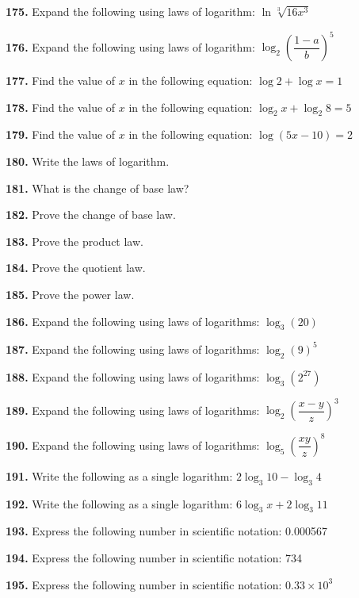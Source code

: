 \documentclass[11pt]{article}
\begin{document}
\bigskip
\noindent\textbf{175.} Expand the following using laws of logarithm: $\ln \sqrt[3]{16x^3}$

\bigskip
\noindent\textbf{176.} Expand the following using laws of logarithm: $\log_2\left(\dfrac{1-a}{b}\right)^5$

\bigskip
\noindent\textbf{177.} Find the value of $x$ in the following equation: $\log 2 + \log x =1$

\bigskip
\noindent\textbf{178.} Find the value of $x$ in the following equation: $\log_2 x+\log_2 8=5$

\bigskip
\noindent\textbf{179.} Find the value of $x$ in the following equation: $\log(5x-10)=2$

\bigskip
\noindent\textbf{180.} Write the laws of logarithm.

\bigskip
\noindent\textbf{181.} What is the change of base law?

\bigskip
\noindent\textbf{182.} Prove the change of base law.

\bigskip
\noindent\textbf{183.} Prove the product law.

\bigskip
\noindent\textbf{184.} Prove the quotient law.

\bigskip
\noindent\textbf{185.} Prove the power law.

\bigskip
\noindent\textbf{186.} Expand the following using laws of logarithms: $\log_3(20)$

\bigskip
\noindent\textbf{187.} Expand the following using laws of logarithms: $\log_2(9)^5$

\bigskip
\noindent\textbf{188.} Expand the following using laws of logarithms: $\log_3\left(2^{27}\right)$

\bigskip
\noindent\textbf{189.} Expand the following using laws of logarithms: $\log_2\left(\dfrac{x-y}{z}\right)^3$

\bigskip
\noindent\textbf{190.} Expand the following using laws of logarithms: $\log_5\left(\dfrac{xy}{z}\right)^8$

\bigskip
\noindent\textbf{191.} Write the following as a single logarithm: $2\log_3 10 -\log_3 4$

\bigskip
\noindent\textbf{192.} Write the following as a single logarithm: $6\log_3 x + 2\log_3 11$

\bigskip
\noindent\textbf{193.} Express the following number in scientific notation: 0.000567

\bigskip
\noindent\textbf{194.} Express the following number in scientific notation: 734

\bigskip
\noindent\textbf{195.} Express the following number in scientific notation: $0.33\times10^{3}$
\end{document}
